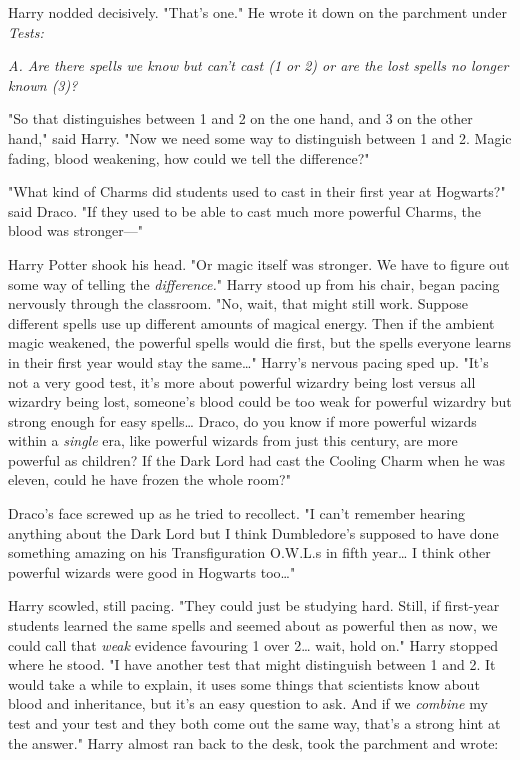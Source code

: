 Harry nodded decisively. "That's one." He wrote it down on the parchment under
\emph{Tests:}

\emph{A. Are there spells we know but can't cast (1 or 2) or are the lost
spells no longer known (3)?}

"So that distinguishes between 1 and 2 on the one hand, and 3 on the other
hand," said Harry. "Now we need some way to distinguish between 1 and 2. Magic
fading, blood weakening, how could we tell the difference?"

"What kind of Charms did students used to cast in their first year at
Hogwarts?" said Draco. "If they used to be able to cast much more powerful
Charms, the blood was stronger---"

Harry Potter shook his head. "Or magic itself was stronger. We have to figure
out some way of telling the \emph{difference.}" Harry stood up from his chair,
began pacing nervously through the classroom. "No, wait, that might still work.
Suppose different spells use up different amounts of magical energy. Then if
the ambient magic weakened, the powerful spells would die first, but the spells
everyone learns in their first year would stay the same{\ldots}" Harry's
nervous pacing sped up. "It's not a very good test, it's more about powerful
wizardry being lost versus all wizardry being lost, someone's blood could be
too weak for powerful wizardry but strong enough for easy spells{\ldots} Draco,
do you know if more powerful wizards within a \emph{single} era, like powerful
wizards from just this century, are more powerful as children? If the Dark Lord
had cast the Cooling Charm when he was eleven, could he have frozen the whole
room?"

Draco's face screwed up as he tried to recollect. "I can't remember hearing
anything about the Dark Lord but I think Dumbledore's supposed to have done
something amazing on his Transfiguration O.W.L.s in fifth year{\ldots} I think
other powerful wizards were good in Hogwarts too{\ldots}"

Harry scowled, still pacing. "They could just be studying hard. Still, if
first-year students learned the same spells and seemed about as powerful then
as now, we could call that \emph{weak} evidence favouring 1 over 2{\ldots} wait,
hold on." Harry stopped where he stood. "I have another test that might
distinguish between 1 and 2. It would take a while to explain, it uses some
things that scientists know about blood and inheritance, but it's an easy
question to ask. And if we \emph{combine} my test and your test and they both
come out the same way, that's a strong hint at the answer." Harry almost ran
back to the desk, took the parchment and wrote:

